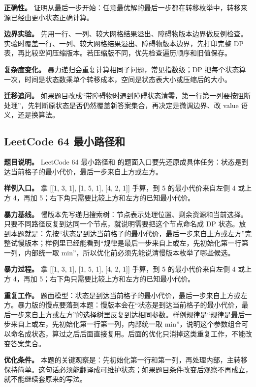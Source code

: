\textbf{正确性。} 证明从最后一步开始：任意最优解的最后一步都在转移枚举中，转移来源已经由更小状态正确计算。

\textbf{边界实验。} 先用一行、一列、较大网格结果溢出、障碍物版本边界做反例检查。实验时覆盖一行、一列、较大网格结果溢出、障碍物版本边界，先打印完整 DP 表，再比较空间压缩版本。若压缩版不同，优先检查遍历顺序和旧值保存。

\textbf{复杂度变化。} 暴力递归会重复计算相同子问题，常见指数级；DP 把每个状态算一次，时间是状态数乘单个转移成本，空间是状态表大小或压缩后的大小。

\textbf{迁移追问。} 如果题目改成“带障碍物时遇到障碍状态清零，第一行第一列要按阻断处理”，先判断原状态是否仍然覆盖新答案集合，再决定是微调边界、改 value 语义，还是换算法。

\subsection{LeetCode 64 最小路径和}

\textbf{题目说明。} LeetCode 64 最小路径和 的题面入口要先还原成具体任务：状态是到达当前格子的最小代价，最后一步来自上方或左方。

\textbf{样例入口。} 拿 [[1, 3, 1], [1, 5, 1], [4, 2, 1]] 手算，到 5 的最小代价来自左侧 4 或上方 4，再加 5；右下角只需要比较上方和左方的已知最小代价。

\textbf{暴力基线。} 慢版本先写递归搜索树：节点表示处理位置、剩余资源和当前选择。只要不同路径反复到达同一个节点，就说明需要把这个节点命名成 DP 状态。放到本题就是：先按“状态是到达当前格子的最小代价，最后一步来自上方或左方”完整试慢版本；样例里已经能看到“规律是最后一步来自上或左，先初始化第一行第一列，内部统一取 min”，所以优化前必须先能说清慢版本枚举了哪些候选。

\textbf{暴力过程。} 拿 [[1, 3, 1], [1, 5, 1], [4, 2, 1]] 手算，到 5 的最小代价来自左侧 4 或上方 4，再加 5；右下角只需要比较上方和左方的已知最小代价。

\textbf{重复工作。} 题面模型：状态是到达当前格子的最小代价，最后一步来自上方或左方。暴力版的慢点要落到本题：慢版本会在“状态是到达当前格子的最小代价，最后一步来自上方或左方”的选择树里反复到达相同参数。样例规律是“规律是最后一步来自上或左，先初始化第一行第一列，内部统一取 min”，说明这个参数组合可以命名成状态，算过之后后面直接复用。后面的优化只消掉这类重复工作，不能改变答案集合。

\textbf{优化条件。} 本题的关键观察是：先初始化第一行和第一列，再处理内部，主转移保持简单。这句话必须能翻译成可维护状态；如果题目条件改变后观察不再成立，就不能继续套原来的写法。

